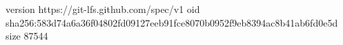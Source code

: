 version https://git-lfs.github.com/spec/v1
oid sha256:583d74a6a36f04802fd09127eeb91fce8070b0952f9eb8394ac8b41ab6fd0e5d
size 87544
